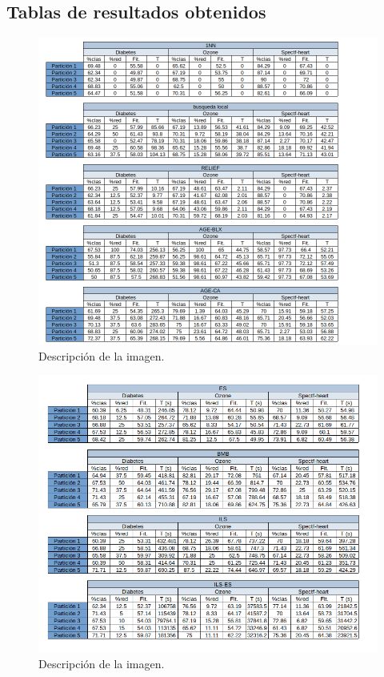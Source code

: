\documentclass[12pt, spanish]{article}
\begin{document}
\subsection{Tablas de resultados obtenidos}
\begin{figure}[htbp]
  \centering
  \includegraphics[width=\textwidth]{tables1.png}
  \caption{Descripción de la imagen.}
  \label{fig:imagen}
\end{figure}

\begin{figure}[htbp]
  \centering
  \includegraphics[width=\textwidth]{tables2.png}
  \caption{Descripción de la imagen.}
  \label{fig:imagen}
\end{figure}
\end{document}
